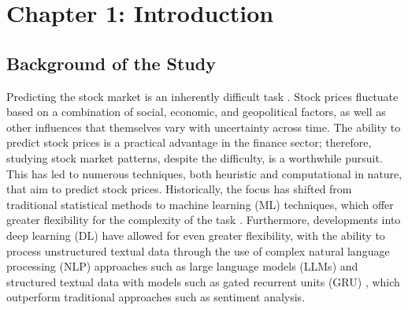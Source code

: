 \documentclass[stu,floatsintext]{apa7}
\begin{document}
\clearpage
{}
\setcounter{page}{1}

\section{Chapter 1: Introduction}
\subsection{Background of the Study}
Predicting the stock market is an inherently difficult task \parencite{yang2022deep}. Stock prices fluctuate based on a combination of social, economic, and geopolitical factors, as well as other influences that themselves vary with uncertainty across time. The ability to predict stock prices is a practical advantage in the finance sector; therefore, studying stock market patterns, despite the difficulty, is a worthwhile pursuit. This has led to numerous techniques, both heuristic and computational in nature, that aim to predict stock prices. Historically, the focus has shifted from traditional statistical methods to machine learning (ML) techniques, which offer greater flexibility for the complexity of the task \parencite{darwish2025stock}. Furthermore, developments into deep learning (DL) have allowed for even greater flexibility, with the ability to process unstructured textual data through the use of complex natural language processing (NLP) approaches such as large language models (LLMs) and structured textual data with models such as gated recurrent units (GRU) \parencite{puh2023predicting}, which outperform traditional approaches such as sentiment analysis.
\end{document}
